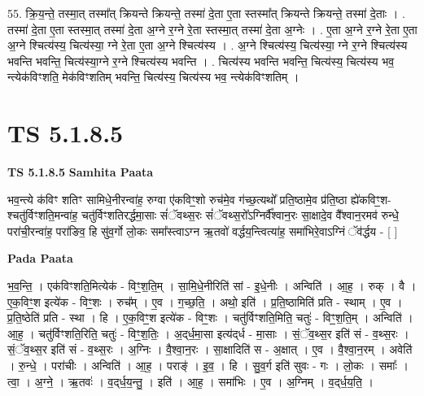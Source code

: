 \documentclass[17pt]{extarticle}
\begin{document}
55. क्रि॒य॒न्ते॒ तस्मा॒त् तस्मा᳚त् क्रियन्ते क्रियन्ते॒ तस्मा॑ दे॒ता ए॒ता स्तस्मा᳚त् क्रियन्ते क्रियन्ते॒ तस्मा॑ दे॒ताः । . तस्मा॑ दे॒ता ए॒ता स्तस्मा॒त् तस्मा॑ दे॒ता अ॒ग्ने र॒ग्ने रे॒ता स्तस्मा॒त् तस्मा॑ दे॒ता अ॒ग्नेः । . ए॒ता अ॒ग्ने र॒ग्ने रे॒ता ए॒ता अ॒ग्ने श्चित्य॑स्य॒ चित्य॑स्या॒ ग्ने रे॒ता ए॒ता अ॒ग्ने श्चित्य॑स्य । . अ॒ग्ने श्चित्य॑स्य॒ चित्य॑स्या॒ ग्ने र॒ग्ने श्चित्य॑स्य भवन्ति भवन्ति॒ चित्य॑स्या॒ग्ने र॒ग्ने श्चित्य॑स्य भवन्ति । . चित्य॑स्य भवन्ति भवन्ति॒ चित्य॑स्य॒ चित्य॑स्य भव॒ न्त्येक॑विꣳशति॒ मेक॑विꣳशतिम् भवन्ति॒ चित्य॑स्य॒ चित्य॑स्य भव॒ न्त्येक॑विꣳशतिम् । \newline
\pagebreak
{}

\section{ TS 5.1.8.5 }

\textbf{TS 5.1.8.5 } \newline
\textbf{Samhita Paata} \newline

भव॒न्त्ये क॑विꣳ शतिꣳ सामिधे॒नीरन्वा॑ह॒ रुग्वा ए॑कविꣳ॒॒शो रुच॑मे॒व ग॑च्छ॒त्यथो᳚ प्रति॒ष्ठामे॒व प्र॑ति॒ष्ठा ह्ये॑कविꣳ॒॒श-श्चतु॑र्विꣳशति॒मन्वा॑ह॒ चतु॑र्विꣳशतिरर्द्धमा॒साः सं॑ॅवथ्स॒रः सं॑ॅवथ्स॒रो᳚ऽग्निर्वै᳚श्वान॒रः सा॒क्षादे॒व वै᳚श्वान॒रमव॑ रुन्धे॒ परा॑ची॒रन्वा॑ह॒ परा॑ङिव॒ हि सु॑व॒र्गो लो॒कः समा᳚स्त्वाऽग्न ऋ॒तवो॑ वर्द्धय॒न्त्वित्या॑ह॒ समा॑भिरे॒वाऽग्निं ॅव॑र्द्धय - [  ] \newline

\textbf{Pada Paata} \newline

भ॒व॒न्ति॒ । एक॑विꣳशति॒मित्येक॑ - विꣳ॒॒श॒ति॒म् । सा॒मि॒धे॒नीरिति॑ सां - इ॒धे॒नीः । अन्विति॑ । आ॒ह॒ । रुक् । वै । ए॒क॒विꣳ॒॒श इत्ये॑क - विꣳ॒॒शः । रुच᳚म् । ए॒व । ग॒च्छ॒ति॒ । अथो॒ इति॑ । प्र॒ति॒ष्ठामिति॑ प्रति - स्थाम् । ए॒व । प्र॒ति॒ष्ठेति॑ प्रति - स्था । हि । ए॒क॒विꣳ॒॒श इत्ये॑क - विꣳ॒॒शः । चतु॑र्विꣳशति॒मिति॒ चतुः॑ - विꣳ॒॒श॒ति॒म् । अन्विति॑ । आ॒ह॒ । चतु॑र्विꣳशति॒रिति॒ चतुः॑ - विꣳ॒॒श॒तिः॒ । अ॒द्‌र्ध॒मा॒सा इत्य॑द्‌र्ध - मा॒साः । सं॒ॅव॒थ्स॒र इति॑ सं - व॒थ्स॒रः । सं॒ॅव॒थ्स॒र इति॑ सं - व॒थ्स॒रः । अ॒ग्निः । वै॒श्वा॒न॒रः । सा॒क्षादिति॑ स - अ॒क्षात् । ए॒व । वै॒श्वा॒न॒रम् । अवेति॑ । रु॒न्धे॒ । परा॑चीः । अन्विति॑ । आ॒ह॒ । पराङ्॑ । इ॒व॒ । हि । सु॒व॒र्ग इति॑ सुवः - गः । लो॒कः । समाः᳚ । त्वा॒ । अ॒ग्ने॒ । ऋ॒तवः॑ । व॒द्‌र्ध॒य॒न्तु॒ । इति॑ । आ॒ह॒ । समा॑भिः । ए॒व । अ॒ग्निम् । व॒द्‌र्ध॒य॒ति॒ ।  \newline
\end{document}
